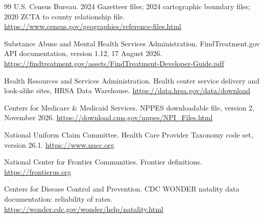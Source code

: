 \documentclass[10pt,twocolumn,letterpaper]{article}
\begin{document}
\begin{thebibliography}{99}
 U.S. Census Bureau. 2024 Gazetteer files; 2024 cartographic boundary files; 2020 ZCTA to county relationship file. \url{https://www.census.gov/geographies/reference-files.html}

 Substance Abuse and Mental Health Services Administration. FindTreatment.gov API documentation, version 1.12, 17 August 2026. \url{https://findtreatment.gov/assets/FindTreatment-Developer-Guide.pdf}

 Health Resources and Services Administration. Health center service delivery and look-alike sites, HRSA Data Warehouse. \url{https://data.hrsa.gov/data/download}

 Centers for Medicare \& Medicaid Services. NPPES downloadable file, version 2, November 2026. \url{https://download.cms.gov/nppes/NPI_Files.html}

 National Uniform Claim Committee. Health Care Provider Taxonomy code set, version 26.1. \url{https://www.nucc.org}

 National Center for Frontier Communities. Frontier definitions. \url{https://frontierus.org}

 Centers for Disease Control and Prevention. CDC WONDER natality data documentation: reliability of rates. \url{https://wonder.cdc.gov/wonder/help/natality.html}

\end{thebibliography}
\end{document}
